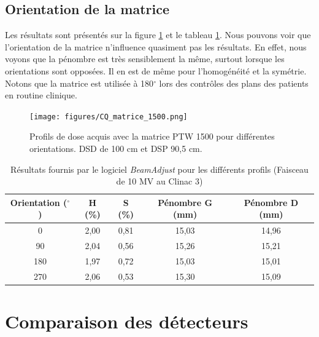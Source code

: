 \documentclass{book}
\begin{document}
  

\subsection{Orientation de la matrice}

Les résultats sont présentés sur la figure \ref*{fig_resultats_profils_matrice} et le tableau \ref*{table_resultats_profils_matrice}. Nous pouvons voir que l'orientation de la matrice n'influence quasiment pas les résultats. En effet, nous voyons que la pénombre est très sensiblement la même, surtout lorsque les orientations sont opposées. Il en est de même pour l'homogénéité et la symétrie. Notons que la matrice est utilisée à 180$^{\circ}$ lors des contrôles des plans des patients en routine clinique.

\begin{figure}[h]
  \centering
  \texttt{[image: figures/CQ\_matrice\_1500.png]}
  \caption{Profils de dose acquis avec la matrice PTW 1500 pour différentes orientations. DSD de 100 cm et DSP 90,5 cm.}
  \label{fig_resultats_profils_matrice}
\end{figure}

\begin{table}[h]
  \centering
  \begin{tabular}{ccccc}
  \toprule
  \textbf{Orientation ($\mathbf{^{\circ}}$\textbf{)}} & \textbf{H (\%)} & \textbf{S (\%)} & \textbf{Pénombre G (mm)} & \textbf{Pénombre D (mm)} \\ \toprule
  0 & 2,00 & 0,81 & 15,03 & 14,96 \\
  90 & 2,04 & 0,56 & 15,26 & 15,21 \\
  180 & 1,97 & 0,72 & 15,03 & 15,01 \\
  270 & 2,06 & 0,53 & 15,30 & 15,09 \\ \bottomrule
  \end{tabular}
  \caption{Résultats fournis par le logiciel \textit{BeamAdjust} pour les différents profils (Faisceau de 10 MV au Clinac 3)}
  \label{table_resultats_profils_matrice}
\end{table}

\section{Comparaison des détecteurs}
\end{document}
